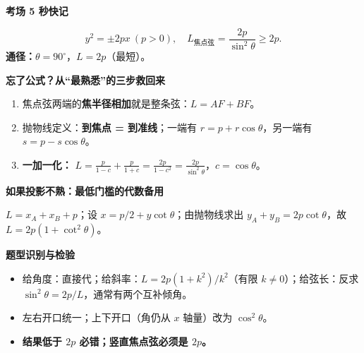 \clearpage
\begin{summarybox}
\textbf{\textcolor{CSummary}{考场 5 秒快记}}\par
\[
\boxed{y^2=\pm2px\ (p>0),\quad
L_{\text{焦点弦}}=\frac{2p}{\sin^2\theta}\ge2p.}
\]
\textbf{通径：}$\theta=90^\circ$，$L=2p$（最短）。\par\par\medskip
\textbf{\textcolor{CSummary}{忘了公式？从“最熟悉”的三步救回来}}\par
\begin{enumerate}[leftmargin=*,itemsep=.25em]
\item 焦点弦两端的\textbf{焦半径相加}就是整条弦：$L=AF+BF$。
\item 抛物线定义：\textbf{到焦点 = 到准线}；一端有 $r=p+r\cos\theta$，另一端有 $s=p-s\cos\theta$。
\item \textbf{一加一化：}
$L=\frac p{1-c}+\frac p{1+c}=\frac{2p}{1-c^2}=\frac{2p}{\sin^2\theta}$，$c=\cos\theta$。
\end{enumerate}
\textbf{\textcolor{CSummary}{如果投影不熟：最低门槛的代数备用}}\par
$L=x_A+x_B+p$；设 $x=p/2+y\cot\theta$；由抛物线求出
$y_A+y_B=2p\cot\theta$，故 $L=2p(1+\cot^2\theta)$。
\par\medskip
\textbf{\textcolor{CSummary}{题型识别与检验}}\par
\begin{itemize}[leftmargin=*,itemsep=.15em]
\item 给角度：直接代；给斜率：$L=2p(1+k^2)/k^2$（有限 $k\ne0$）；给弦长：反求 $\sin^2\theta=2p/L$，通常有两个互补倾角。
\item 左右开口统一；上下开口（角仍从 $x$ 轴量）改为 $\cos^2\theta$。
\item \textbf{结果低于 $2p$ 必错；竖直焦点弦必须是 $2p$。}
\end{itemize}
\end{summarybox}
